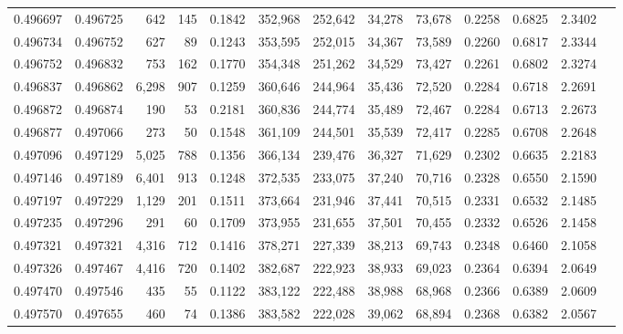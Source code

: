 \begin{tabular}{rrrrrrrrrrrrr}
0.496697 & 0.496725 &   642 &   145 &                                     0.1842 & 352,968 & 252,642 &  34,278 &  73,678 & 0.2258 & 0.6825 & 2.3402 \\
0.496734 & 0.496752 &   627 &    89 &                                     0.1243 & 353,595 & 252,015 &  34,367 &  73,589 & 0.2260 & 0.6817 & 2.3344 \\
0.496752 & 0.496832 &   753 &   162 &                                     0.1770 & 354,348 & 251,262 &  34,529 &  73,427 & 0.2261 & 0.6802 & 2.3274 \\
0.496837 & 0.496862 & 6,298 &   907 &                                     0.1259 & 360,646 & 244,964 &  35,436 &  72,520 & 0.2284 & 0.6718 & 2.2691 \\
0.496872 & 0.496874 &   190 &    53 &                                     0.2181 & 360,836 & 244,774 &  35,489 &  72,467 & 0.2284 & 0.6713 & 2.2673 \\
0.496877 & 0.497066 &   273 &    50 &                                     0.1548 & 361,109 & 244,501 &  35,539 &  72,417 & 0.2285 & 0.6708 & 2.2648 \\
0.497096 & 0.497129 & 5,025 &   788 &                                     0.1356 & 366,134 & 239,476 &  36,327 &  71,629 & 0.2302 & 0.6635 & 2.2183 \\
0.497146 & 0.497189 & 6,401 &   913 &                                     0.1248 & 372,535 & 233,075 &  37,240 &  70,716 & 0.2328 & 0.6550 & 2.1590 \\
0.497197 & 0.497229 & 1,129 &   201 &                                     0.1511 & 373,664 & 231,946 &  37,441 &  70,515 & 0.2331 & 0.6532 & 2.1485 \\
0.497235 & 0.497296 &   291 &    60 &                                     0.1709 & 373,955 & 231,655 &  37,501 &  70,455 & 0.2332 & 0.6526 & 2.1458 \\
0.497321 & 0.497321 & 4,316 &   712 &                                     0.1416 & 378,271 & 227,339 &  38,213 &  69,743 & 0.2348 & 0.6460 & 2.1058 \\
0.497326 & 0.497467 & 4,416 &   720 &                                     0.1402 & 382,687 & 222,923 &  38,933 &  69,023 & 0.2364 & 0.6394 & 2.0649 \\
0.497470 & 0.497546 &   435 &    55 &                                     0.1122 & 383,122 & 222,488 &  38,988 &  68,968 & 0.2366 & 0.6389 & 2.0609 \\
0.497570 & 0.497655 &   460 &    74 &                                     0.1386 & 383,582 & 222,028 &  39,062 &  68,894 & 0.2368 & 0.6382 & 2.0567 \\

\end{tabular}
